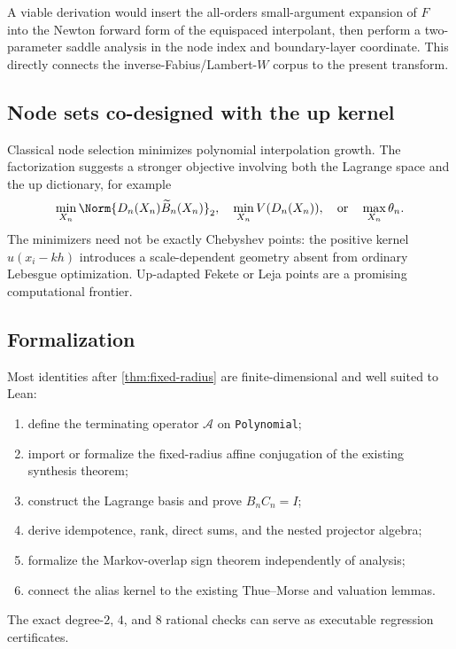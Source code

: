 \documentclass[11pt,oneside]{article}
\numberwithin{equation}{section}
\theoremstyle{definition}
\theoremstyle{remark}
\newcommand{\App}{\mathscr A}
\begin{document}
A viable derivation would insert the all-orders small-argument expansion of
$F$ into the Newton forward form of the equispaced interpolant, then perform
a two-parameter saddle analysis in the node index and boundary-layer
coordinate.  This directly connects the inverse-Fabius/Lambert-$W$ corpus to
the present transform.

\subsection{Node sets co-designed with the up kernel}

Classical node selection minimizes polynomial interpolation growth.  The
factorization suggests a stronger objective involving both the Lagrange
space and the up dictionary, for example
\begin{equation}
 \min_{X_n}\Norm{D_n(X_n)\widetilde B_n(X_n)}_2,
 \quad
 \min_{X_n}V(D_n(X_n)),
 \quad\text{or}\quad
 \max_{X_n}\theta_n.
 \label{eq:node-design}
\end{equation}
The minimizers need not be exactly Chebyshev points: the positive kernel
$u(x_i-kh)$ introduces a scale-dependent geometry absent from ordinary
Lebesgue optimization.  Up-adapted Fekete or Leja points are a promising
computational frontier.

\subsection{Formalization}

Most identities after \cref{thm:fixed-radius} are finite-dimensional and
well suited to Lean:
\begin{enumerate}
\item define the terminating operator $\App$ on \texttt{Polynomial};
\item import or formalize the fixed-radius affine conjugation of the existing
synthesis theorem;
\item construct the Lagrange basis and prove $B_nC_n=I$;
\item derive idempotence, rank, direct sums, and the nested projector algebra;
\item formalize the Markov-overlap sign theorem independently of analysis;
\item connect the alias kernel to the existing Thue--Morse and valuation
lemmas.
\end{enumerate}
The exact degree-$2$, $4$, and $8$ rational checks can serve as executable
regression certificates.
\end{document}
